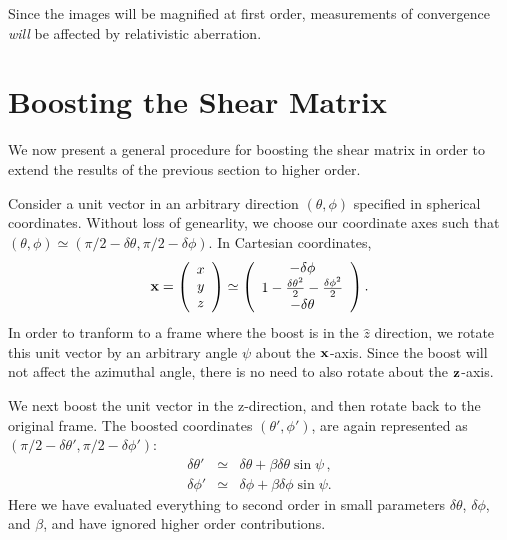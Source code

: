 \documentclass[useAMS,fleqn, usenatbib]{mn2e}
\begin{document}
Since the images will be magnified at first order, measurements
of convergence {\it will} be affected by relativistic aberration.



\section{Boosting the Shear Matrix}
\label{shear}

We now present a general procedure for boosting the shear matrix in order to extend the results of the previous section to higher order.

Consider a unit vector  in an arbitrary direction $(\theta,\phi)$ specified in spherical coordinates.  Without loss of genearlity, we choose our coordinate axes such that 
$(\theta,\phi)\simeq(\pi/2-\delta\theta,\pi/2-\delta\phi)$.   In Cartesian coordinates,
\begin{equation}
{\bf x}=\left(\begin{array}{c}
x\\
y\\
z
\end{array}\right)\simeq\left(\begin{array}{c}
-\delta\phi\\
1-\frac{\delta\theta^{2}}{2}-\frac{\delta\phi^{2}}{2}\\
-\delta\theta
\end{array}\right).
\end{equation}
In order to tranform to a frame where the boost is in the $\hat z$ direction, we rotate this unit vector by an arbitrary angle $\psi$ about the ${\bf x}$-axis. Since the boost will not affect the azimuthal angle, there is no need to also rotate about the ${\bf z}$-axis.

We next boost the unit vector in the z-direction, and then rotate back to the original frame.
The boosted coordinates $(\theta',\phi')$, are
again represented as
 $(\pi/2-\delta\theta',\pi/2-\delta\phi')$:
\begin{eqnarray}
\delta\theta' & \simeq &\delta\theta+\beta\delta\theta\sin\psi\,,\\
\delta\phi' & \simeq & \delta\phi+\beta\delta\phi\sin\psi.
\end{eqnarray}
Here we have evaluated everything to second order in small parameters
$\delta\theta$, $\delta\phi$, and $\beta$, and have ignored higher order contributions.
\end{document}
